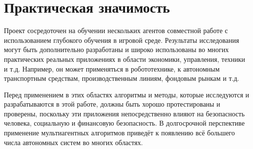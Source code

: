\section{Практическая значимость} \label{intro:sec3}

Проект сосредоточен на обучении нескольких агентов совместной работе с использованием глубокого обучения в игровой среде. Результаты исследования могут быть дополнительно разработаны и широко использованы во многих практических реальных приложениях в области экономики, управления, техники и т.д. Например, он может применяться в робототехнике, к автономным транспортным средствам, производственным линиям, фондовым рынкам и т.д.

Перед применением в этих областях алгоритмы и методы, которые исследуются и разрабатываются в этой работе, должны быть хорошо протестированы и проверены, поскольку эти приложения непосредственно влияют на безопасность человека, социальную и финансовую безопасность. В долгосрочной перспективе применение мультиагентных алгоритмов приведёт к появлению всё большего числа автономных систем во многих областях.


